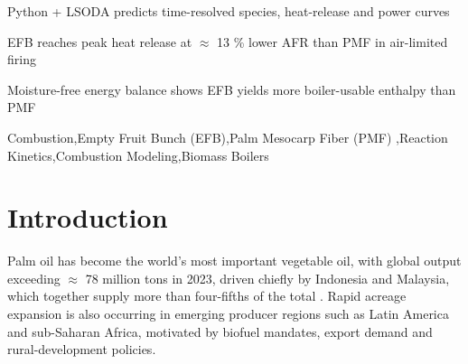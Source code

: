 \documentclass[preprint,12pt]{elsarticle}
\begin{document}
\begin{frontmatter}
\begin{highlights}
\item Python + LSODA predicts time-resolved species, heat-release and power curves

\item EFB reaches peak heat release at $\approx$ 13 \% lower AFR than PMF in air-limited firing

\item Moisture-free energy balance shows EFB yields more boiler-usable enthalpy than PMF

\end{highlights}

\begin{keyword}
Combustion\sep Empty Fruit Bunch (EFB)\sep Palm Mesocarp Fiber (PMF) \sep Reaction Kinetics\sep Combustion Modeling\sep Biomass Boilers


\end{keyword}

\end{frontmatter}

\section{Introduction}\label{intro}
Palm oil has become the world’s most important vegetable oil, with global output exceeding $\approx$ 78 million tons in 2023, driven chiefly by Indonesia and Malaysia, which together supply more than four-fifths of the total \cite{FAOSTAT2024,USDA2024}. Rapid acreage expansion is also occurring in emerging producer regions such as Latin America and sub-Saharan Africa, motivated by biofuel mandates, export demand and rural-development policies. \\

\end{document}

